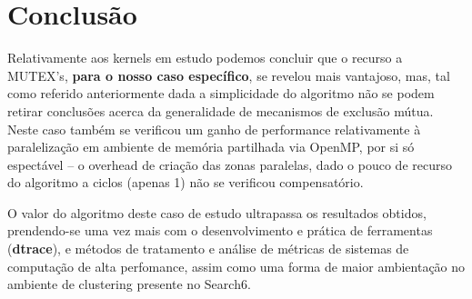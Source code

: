 \documentclass[conference,compsoc]{IEEEtran}
\begin{document}
\section{Conclusão}
Relativamente aos kernels em estudo podemos concluir que o recurso a MUTEX's, \textbf{para o nosso caso específico}, se revelou mais vantajoso, mas, tal como referido anteriormente dada a simplicidade do algoritmo não se podem retirar conclusões acerca da generalidade de mecanismos de exclusão mútua.
Neste caso também se verificou um ganho de performance relativamente à paralelização em ambiente de memória partilhada via OpenMP, por si só espectável -- o overhead de criação das zonas paralelas, dado o pouco de recurso do algoritmo a ciclos (apenas 1) não se verificou compensatório.\par 
O valor do algoritmo deste caso de estudo ultrapassa os resultados obtidos, prendendo-se uma vez mais com o desenvolvimento e prática de ferramentas (\textbf{dtrace}), e métodos de tratamento e análise de métricas de sistemas de computação de alta perfomance, assim como uma forma de maior ambientação no ambiente de clustering presente no Search6.



















\end{document}
